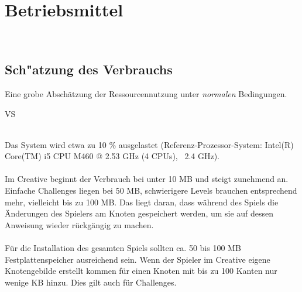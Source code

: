 %
%


\chapter{Betriebsmittel}
\label{BM}~\\

\section{Sch{"a}tzung des Verbrauchs}
\label{BM:Verbrauch}

Eine grobe Abschätzung der Ressourcennutzung unter \textit{normalen} Bedingungen.\\

\begin{ids}{\gls{VS}}

	 \hfill\\
	
	Das System wird etwa zu 10 \% ausgelastet (Referenz-Prozessor-System: Intel(R) Core(TM) i5 CPU M460 @ 2.53 GHz (4 CPUs), ~2.4 GHz).\\
	
	 \hfill\\
	
	Im Creative beginnt der Verbrauch bei unter 10 MB und steigt zunehmend an. Einfache Challenges liegen bei 50 MB, schwierigere Levels brauchen entsprechend mehr, vielleicht bis zu 100 MB. Das liegt daran, dass während des Spiels die Änderungen des Spielers am Knoten gespeichert werden, um sie auf dessen Anweisung wieder rückgängig zu machen.\\
	
	
	 \hfill\\
		
	Für die Installation des gesamten Spiels sollten ca. 50 bis 100 MB Festplattenspeicher ausreichend sein. Wenn der Spieler im Creative eigene Knotengebilde erstellt kommen für einen Knoten mit bis zu 100 Kanten nur wenige KB hinzu. Dies gilt auch für Challenges.\\

\end{ids}


